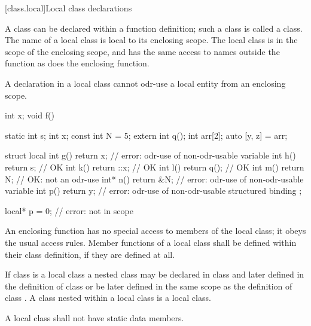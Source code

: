 [class.local]{Local class declarations}
%
%
%

\pnum
A class can be declared within a function definition; such a class is
called a  class. The name of a local class is local to
its enclosing scope.
%
The local class is in the scope of the enclosing scope, and has the same
access to names outside the function as does the enclosing function.
\begin{note}
A declaration in a local class
cannot odr-use
a local entity
from an
enclosing scope.
\end{note}
\begin{example}
\begin{codeblock}
int x;
void f() {
  static int s;
  int x;
  const int N = 5;
  extern int q();
  int arr[2];
  auto [y, z] = arr;

  struct local {
    int g() { return x; }       // error: odr-use of non-odr-usable variable 
    int h() { return s; }       // OK
    int k() { return ::x; }     // OK
    int l() { return q(); }     // OK
    int m() { return N; }       // OK: not an odr-use
    int* n() { return &N; }     // error: odr-use of non-odr-usable variable 
    int p() { return y; }       // error: odr-use of non-odr-usable structured binding 
  };
}

local* p = 0;                   // error:  not in scope
\end{codeblock}
\end{example}

\pnum
An enclosing function has no special access to members of the local
class; it obeys the usual access rules.
%
Member functions of a local class shall be defined within their class
definition, if they are defined at all.

\pnum
{}%
If class  is a local class a nested class  may be
declared in class  and later defined in the definition of class
 or be later defined in the same scope as the definition of
class .
%
A class nested within
a local class is a local class.

\pnum
{}%
A local class shall not have static data members.
